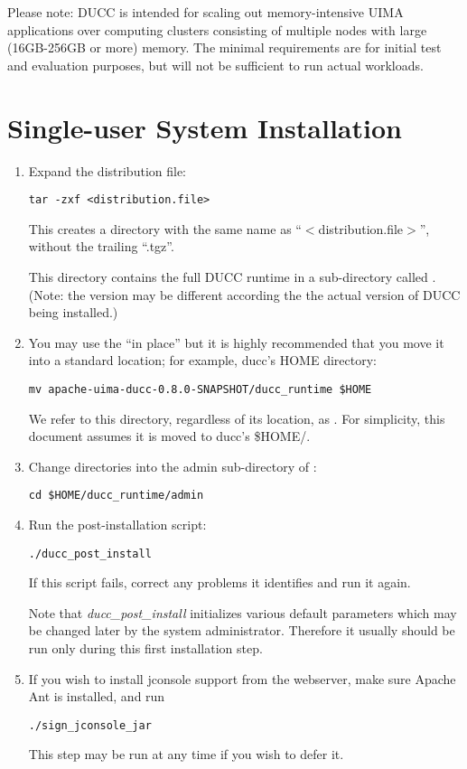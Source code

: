 Please note: DUCC is intended for scaling out memory-intensive UIMA applications over computing
clusters consisting of multiple nodes with large (16GB-256GB or more) memory.  The minimal
requirements are for initial test and evaluation purposes, but will not be sufficient to run actual
workloads.

\section{Single-user System Installation}
\label{subsec:install.single-user}
    \begin{enumerate}
      \item Expand the distribution file:
\begin{verbatim}
tar -zxf <distribution.file>
\end{verbatim}

        This creates a directory with the same name as ``$<$distribution.file$>$'', without the trailing ``.tgz''.
  
        This directory contains the full DUCC runtime in a sub-directory called \duccruntime.  (Note:
        the version may be different according the the actual version of DUCC being installed.)

      \item You may use the \duccruntime ``in place'' but it is highly recommended that you move it
        into a standard location; for example, ducc's HOME directory:
\begin{verbatim}
mv apache-uima-ducc-0.8.0-SNAPSHOT/ducc_runtime $HOME
\end{verbatim}

        We refer to this directory, regardless of its location, as \duccruntime. For simplicity,
        this document assumes it is moved to ducc's \$HOME/\duccruntime.

      \item Change directories into the admin sub-directory of  \duccruntime: 
\begin{verbatim}
cd $HOME/ducc_runtime/admin
\end{verbatim}

        \item Run the post-installation script: 
\begin{verbatim}
./ducc_post_install
\end{verbatim}
          If this script fails, correct any problems it identifies and run it again.

          Note that {\em ducc\_post\_install} initializes various default parameters which 
          may be changed later by the system administrator.  Therefore it usually should be
          run only during this first installation step.

        \item If you wish to install jconsole support from the webserver, make sure Apache Ant
          is installed, and run
\begin{verbatim}
./sign_jconsole_jar
\end{verbatim}
          This step may be run at any time if you wish to defer it.

   \end{enumerate}

